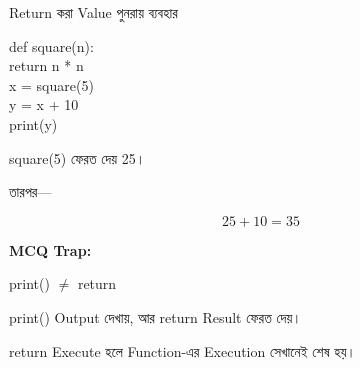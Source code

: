 \begin{codeoutputbox}{Return করা Value পুনরায় ব্যবহার}

\noindent
\begin{minipage}[t]{0.53\linewidth}
\codeheading

\begin{english}
\ttfamily
def square(n):\\
\hspace*{4mm}return n * n\\[0.5mm]
x = square(5)\\
y = x + 10\\
print(y)
\end{english}

\end{minipage}
\hfill
\begin{minipage}[t]{0.43\linewidth}
\outputheading

\begin{center}
\textenglish{}
\end{center}

\textenglish{\ttfamily square(5)}
ফেরত দেয় 25।

তারপর—

\[
25 + 10 = 35
\]

\end{minipage}

\end{codeoutputbox}

\begin{rememberbox}

\textbf{\color{deepOrange}MCQ Trap:}

\begin{center}

\textenglish{\ttfamily print()}
\(\neq\)
\textenglish{\ttfamily return}

\end{center}

\textenglish{\ttfamily print()}
Output দেখায়, আর
\textenglish{\ttfamily return}
Result ফেরত দেয়।

\end{rememberbox}



\textenglish{\ttfamily return}
Execute হলে Function-এর Execution সেখানেই শেষ হয়।


